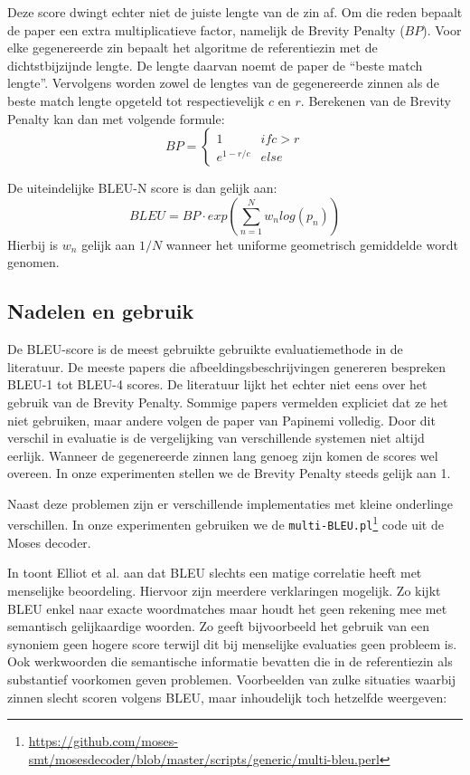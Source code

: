 Deze score dwingt echter niet de juiste lengte van de zin af. Om die reden bepaalt de paper een extra multiplicatieve factor, namelijk de Brevity Penalty ($BP$). Voor elke gegenereerde zin bepaalt het algoritme de referentiezin met de dichtstbijzijnde lengte. De lengte daarvan noemt de paper de ``beste match lengte''. Vervolgens worden zowel de lengtes van de gegenereerde zinnen als de beste match lengte opgeteld tot respectievelijk $c$ en $r$. Berekenen van de Brevity Penalty kan dan met volgende formule:
\begin{equation}BP=
 \begin{cases}
1 & if c > r \\
e^{1-r/c} & else
\end{cases}
\end{equation}

De uiteindelijke BLEU-N score is dan gelijk aan:
\begin{equation}
BLEU = BP\cdot exp(\sum\limits_{n=1}^N w_nlog(p_n))
\end{equation}
Hierbij is $w_n$ gelijk aan $1/N$ wanneer het uniforme geometrisch gemiddelde wordt genomen.

\subsection{Nadelen en gebruik}
De BLEU-score is de meest gebruikte gebruikte evaluatiemethode in de literatuur. De meeste papers die afbeeldingsbeschrijvingen genereren bespreken BLEU-1 tot BLEU-4 scores. De literatuur lijkt het echter niet eens over het gebruik van de Brevity Penalty. Sommige papers vermelden expliciet dat ze het niet gebruiken, maar andere volgen de paper van Papinemi volledig. Door dit verschil in evaluatie is de vergelijking van verschillende systemen niet altijd eerlijk. Wanneer de gegenereerde zinnen lang genoeg zijn komen de scores wel overeen.
In onze experimenten stellen we de Brevity Penalty steeds gelijk aan 1.

Naast deze problemen zijn er verschillende implementaties met kleine onderlinge verschillen. In onze experimenten gebruiken we de \texttt{multi-BLEU.pl}\footnote{\url{https://github.com/moses-smt/mosesdecoder/blob/master/scripts/generic/multi-bleu.perl}} code uit de Moses decoder.

In  toont Elliot et al. aan dat BLEU slechts een matige correlatie heeft met menselijke beoordeling.
Hiervoor zijn meerdere verklaringen mogelijk. Zo kijkt BLEU enkel naar exacte woordmatches maar houdt het geen rekening mee met semantisch gelijkaardige woorden. Zo geeft bijvoorbeeld het gebruik van een synoniem geen hogere score terwijl dit bij menselijke evaluaties geen probleem is. Ook werkwoorden die semantische informatie bevatten die in de referentiezin als substantief voorkomen geven problemen. Voorbeelden van zulke situaties waarbij zinnen slecht scoren volgens BLEU, maar inhoudelijk toch hetzelfde weergeven:
\\

